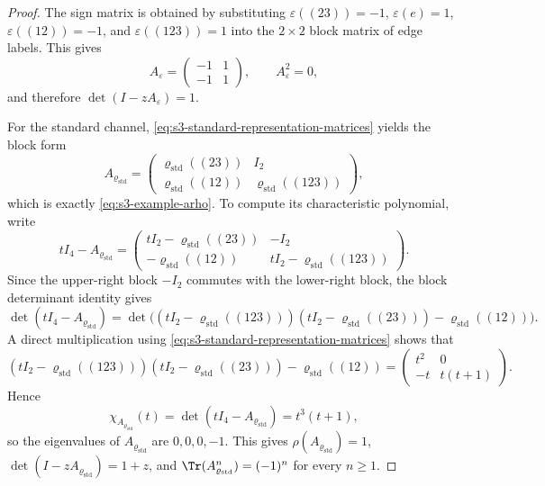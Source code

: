\begin{proof}
  The sign matrix is obtained by substituting
  \(\varepsilon((23))=-1\), \(\varepsilon(e)=1\),
  \(\varepsilon((12))=-1\), and \(\varepsilon((123))=1\) into the
  \(2\times2\) block matrix of edge labels. This gives
  \[
    A_\varepsilon
    =
    \begin{pmatrix}
      -1 & 1 \\
      -1 & 1
    \end{pmatrix},
    \qquad
    A_\varepsilon^2=0,
  \]
  and therefore \(\det(I-zA_\varepsilon)=1\).

  For the standard channel, \eqref{eq:s3-standard-representation-matrices}
  yields the block form
  \[
    A_{\varrho_{\mathrm{std}}}
    =
    \begin{pmatrix}
      \varrho_{\mathrm{std}}((23)) & I_2 \\
      \varrho_{\mathrm{std}}((12)) & \varrho_{\mathrm{std}}((123))
    \end{pmatrix},
  \]
  which is exactly \eqref{eq:s3-example-arho}. To compute its
  characteristic polynomial, write
  \[
    tI_4-A_{\varrho_{\mathrm{std}}}
    =
    \begin{pmatrix}
      tI_2-\varrho_{\mathrm{std}}((23)) & -I_2 \\
      -\varrho_{\mathrm{std}}((12)) & tI_2-\varrho_{\mathrm{std}}((123))
    \end{pmatrix}.
  \]
  Since the upper-right block \(-I_2\) commutes with the lower-right
  block, the block determinant identity gives
  \[
    \det(tI_4-A_{\varrho_{\mathrm{std}}})
    =
    \det\!\bigl((tI_2-\varrho_{\mathrm{std}}((123)))(tI_2-\varrho_{\mathrm{std}}((23)))-\varrho_{\mathrm{std}}((12))\bigr).
  \]
  A direct multiplication using
  \eqref{eq:s3-standard-representation-matrices} shows that
  \[
    (tI_2-\varrho_{\mathrm{std}}((123)))(tI_2-\varrho_{\mathrm{std}}((23)))-\varrho_{\mathrm{std}}((12))
    =
    \begin{pmatrix}
      t^2 & 0 \\
      -t & t(t+1)
    \end{pmatrix}.
  \]
  Hence
  \[
    \chi_{A_{\varrho_{\mathrm{std}}}}(t)=\det(tI_4-A_{\varrho_{\mathrm{std}}})=t^3(t+1),
  \]
  so the eigenvalues of \(A_{\varrho_{\mathrm{std}}}\) are \(0,0,0,-1\). This gives
  \(\rho(A_{\varrho_{\mathrm{std}}})=1\), \(\det(I-zA_{\varrho_{\mathrm{std}}})=1+z\), and
  \(\Tr(A_{\varrho_{\mathrm{std}}}^n)=(-1)^n\) for every \(n\ge 1\).


\end{proof}
